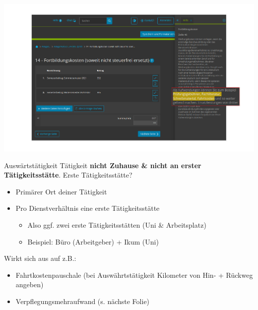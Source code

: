 \documentclass{beamer}
\begin{document}
			\begin{frame}
				\begin{center}
					\vspace{-0.6cm}
					\hspace*{-0.91cm}
					\includegraphics[scale=0.24]{images/elster-fortbildungskosten-3}
				\end{center}
			\end{frame}
		
			\begin{frame}{Auswärtstätigkeit}
				Tätigkeit \textbf{nicht Zuhause \& nicht an erster Tätigkeitsstätte}.\n
				Erste Tätigkeitsstätte?
				\begin{itemize}
					\item Primärer Ort deiner Tätigkeit
					\item Pro Dienstverhältnis eine erste Tätigkeitsstätte
					\begin{itemize}
						\item Also ggf. zwei erste Tätigkeitsstätten (Uni \& Arbeitsplatz)
						\item Beispiel: Büro (Arbeitgeber) + Ikum (Uni)
					\end{itemize}
				\end{itemize}\n\pause
				Wirkt sich aus auf z.B.:
				\begin{itemize}
					\item Fahrtkostenpauschale (bei Auswährtstätigkeit Kilometer von Hin- + Rückweg angeben)
					\item Verpflegungsmehraufwand (s. nächste Folie)
				\end{itemize}
			\end{frame}
		
\end{document}
